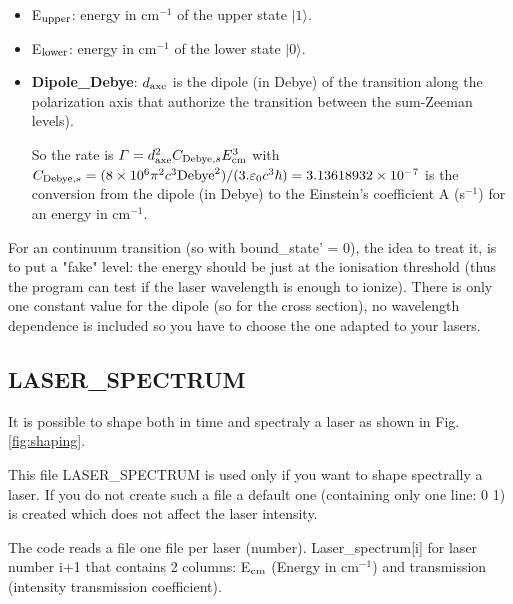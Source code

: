 \documentclass[amsmath,amssymb,nofootinbib]{revtex4-2}
\begin{document}
\begin{itemize}



\item E$_{\rm upper}$: energy in cm$^{-1}$ of the upper state $|1\rangle$.

\item E$_{\rm lower}$: energy in cm$^{-1}$ of the lower state $|0\rangle$.

\item  \textbf{Dipole\_Debye}: $d_{\rm axe}$ is the dipole (in Debye) of the transition along the polarization axis that authorize the transition between the sum-Zeeman levels). 

So  the rate is   $\Gamma = d_{\rm axe}^2 C_{{\rm Debye},s} E_{\rm cm}^3$ 
with  $C_{{\rm Debye},s} = (8\times 10^6 \pi^2 c^3 {\rm Debye}^2 )/(3. \varepsilon_0 c^3 \hbar) = 3.13618932 \times 10^{-7}$ is the conversion from the dipole (in Debye) to the Einstein's coefficient A  (s$^{-1}$) for an energy in cm$^{-1}$.



\end{itemize}



For an continuum transition (so with bound\_state' = 0), the idea to treat it, is to put a "fake" level: the energy should be just at the ionisation threshold (thus the program can test if the laser wavelength is enough to ionize). 
There is only one constant value for the dipole (so for the cross section), no wavelength dependence is included so you have to choose the one adapted to your lasers.




\subsection{LASER\_SPECTRUM} 

It is possible to shape both in time and spectraly a laser as shown in Fig. \ref{fig:shaping}.
 
This file LASER\_SPECTRUM is used only if you want to  shape spectrally a laser.  If you do not create such a file a default one (containing only one line: 0 1) is created which does not affect the laser intensity.


The code reads a file one file per laser (number).
Laser\_spectrum[i] for laser number i+1
that contains 2 columns: E$_{\rm cm}$  (Energy in cm$^{-1}$) and transmission (intensity transmission coefficient).
\end{document}
